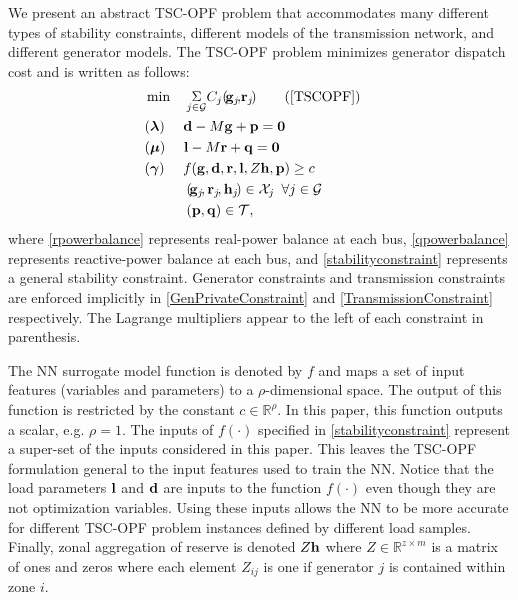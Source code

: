 \documentclass[lettersize,journal]{IEEEtran}
\begin{document}
We present an abstract TSC-OPF problem that accommodates many different types of stability constraints, different models of the transmission network, and different generator models.  The TSC-OPF problem minimizes generator dispatch cost and is written as follows:
\begin{subequations}\label{TSCOPF}
\begin{align} 
& \min \ \ \  \underset{j \in \mathcal{G}}{\textstyle\Sigma} C_j(\!\bold{g}_{j}\!,\!\bold{r}_{j}\!)\tag{\ref{TSCOPF}}\\
&(\boldsymbol{\lambda}) \ \ \ \  \bold{d}-M\bold{g}+\bold{p}= \mathbf{0} & 
\label{rpowerbalance}\\
&(\boldsymbol{\mu}) \ \ \ \  \bold{l}-M\bold{r}+\bold{q}= \mathbf{0} & 
\label{qpowerbalance}\\
&(\boldsymbol{\gamma}) \ \ \ \  f(\bold{g},\bold{d},\bold{r},\bold{l},Z\bold{h},\bold{p})\geq c & \label{stabilityconstraint}\\
&\hspace{30pt}(\!\bold{g}_{j}\!,\bold{r}_{j}\!,\bold{h}_{j}\!)\in\mathcal{X}_j \hspace{5pt}\forall j \in \mathcal{G}\label{GenPrivateConstraint}\\
&\hspace{30pt}(\bold{p},\bold{q})\in\mathcal{T},\label{TransmissionConstraint}
\end{align}
\end{subequations}
where \eqref{rpowerbalance} represents real-power balance at each bus, \eqref{qpowerbalance} represents reactive-power balance at each bus, and \eqref{stabilityconstraint} represents a general stability constraint.   Generator constraints and transmission constraints are enforced implicitly in \eqref{GenPrivateConstraint} and \eqref{TransmissionConstraint} respectively.  The Lagrange multipliers appear to the left of each constraint in parenthesis.  

The NN surrogate model function is denoted by $f$ and maps a set of input features (variables and parameters) to a \mbox{$\rho$-dimensional} space.  The output of this function is restricted by the constant $c\in\mathbb{R}^{\rho}$.  In this paper, this function outputs a scalar, e.g. $\rho=1$.  The inputs of $f(\cdot)$ specified in \eqref{stabilityconstraint} represent a super-set of the inputs considered in this paper.  This leaves the TSC-OPF formulation general to the input features used to train the NN. Notice that the load parameters $\bold{l}$ and $\bold{d}$ are inputs to the function $f(\cdot)$ even though they are not optimization variables.  Using these inputs allows the NN to be more accurate for different TSC-OPF problem instances defined by different load samples.  Finally, zonal aggregation of reserve is denoted $Z\bold{h}$ where $Z\in\mathbb{R}^{z\times m}$ is a matrix of ones and zeros where each element $Z_{ij}$ is one if generator $j$ is contained within zone $i$.
\end{document}
